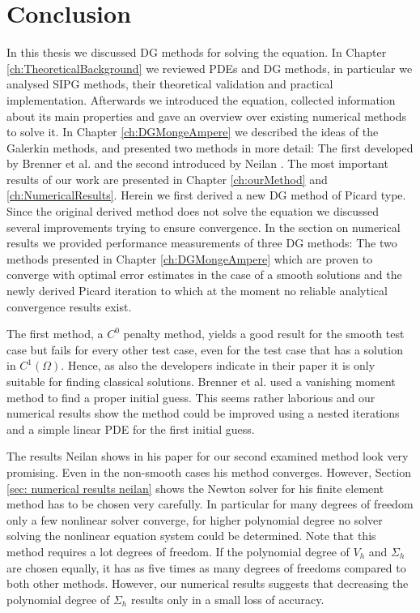 \section{Conclusion}

In this thesis we discussed DG methods for solving the \MA equation. In Chapter \ref{ch:TheoreticalBackground} we reviewed PDEs and DG methods, in particular we analysed SIPG methods, their theoretical validation and practical implementation.
Afterwards we introduced the \MA equation, collected information about its main properties and gave an overview over existing numerical methods to solve it. In Chapter \ref{ch:DGMongeAmpere} we described the ideas of the Galerkin methods, and presented two methods in more detail: The first developed by Brenner et al. \cite{BGN+2011} and the second introduced by Neilan \cite{Neilan2014}.
The most important results of our work are presented in Chapter \ref{ch:ourMethod} and \ref{ch:NumericalResults}. Herein we first derived a new DG method of Picard type. Since the original derived method does not solve the \MA equation we discussed several improvements trying to ensure convergence. 
In the section on numerical results we provided performance measurements of three DG methods: The two methods presented in Chapter \ref{ch:DGMongeAmpere} which are proven to converge with optimal error estimates in the case of a smooth solutions and the newly derived Picard iteration to which at the moment no reliable analytical convergence results exist.

The first method, a $C^0$ penalty method, yields a good result for the smooth test case but fails for every other test case, even for the test case that has a solution in $C^1(\Omega)$. Hence, as also the developers indicate in their paper it is only suitable for finding classical solutions.
Brenner et al. used a vanishing moment method to find a proper initial guess. This seems rather laborious and our numerical results show the method could be improved using a nested iterations and a simple linear PDE for the first initial guess.

The results Neilan shows in his paper for our second examined method look very promising. Even in the non-smooth cases his method converges. However, Section \ref{sec: numerical results neilan} shows the Newton solver for his finite element method has to be chosen very carefully. In particular for many degrees of freedom only a few nonlinear solver converge, for higher polynomial degree no solver solving the nonlinear equation system could be determined.
Note that this method requires a lot degrees of freedom. If the polynomial degree of $V_h$ and $\Sigma_h$ are chosen equally, it has as five times as many degrees of freedoms compared to both other methods. However, our numerical results suggests that decreasing the polynomial degree of $\Sigma_h$ results only in a small loss of accuracy.

